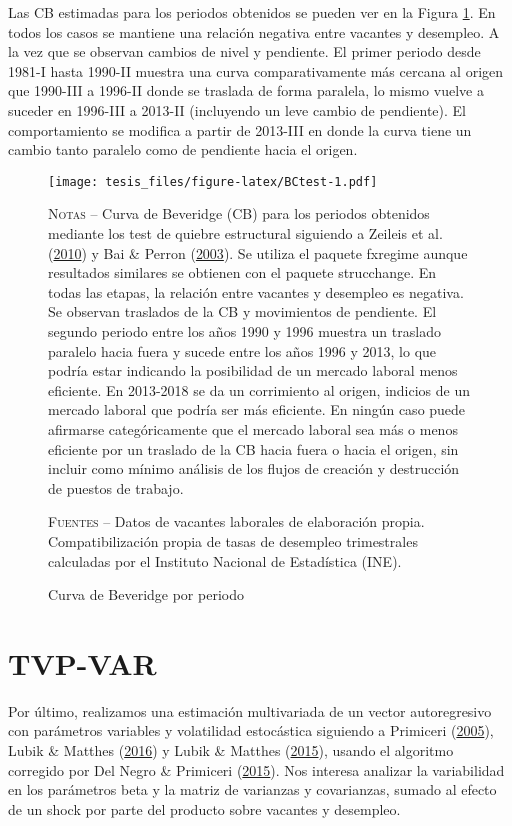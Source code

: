 \documentclass[12pt,oneside]{reedthesis}
\makeatletter
\def\maxwidth{ %
  \ifdim\Gin@nat@width>\linewidth
    \linewidth
  \else
    \Gin@nat@width
  \fi
}
\makeatother
\begin{document}
Las CB estimadas para los periodos obtenidos se pueden ver en la Figura \ref{fig:BCtest}. En todos los casos se mantiene una relación negativa entre vacantes y desempleo. A la vez que se observan cambios de nivel y pendiente. El primer periodo desde 1981-I hasta 1990-II muestra una curva comparativamente más cercana al origen que 1990-III a 1996-II donde se traslada de forma paralela, lo mismo vuelve a suceder en 1996-III a 2013-II (incluyendo un leve cambio de pendiente). El comportamiento se modifica a partir de 2013-III en donde la curva tiene un cambio tanto paralelo como de pendiente hacia el origen.
\begin{figure}
\texttt{[image: tesis\_files/figure-latex/BCtest-1.pdf]}
\caption{Curva de Beveridge por periodo}\label{fig:BCtest}\textsc{}

\footnotesize\textsc{Notas} -- Curva de Beveridge (CB) para los periodos obtenidos mediante los test de quiebre estructural siguiendo a Zeileis et al. (\protect\hyperlink{ref-Zeileis2010}{2010}) y Bai \& Perron (\protect\hyperlink{ref-BaiPerron2003}{2003}). Se utiliza el paquete fxregime aunque resultados similares se obtienen con el paquete strucchange. En todas las etapas, la relación entre vacantes y desempleo es negativa. Se observan traslados de la CB y movimientos de pendiente. El segundo periodo entre los años 1990 y 1996 muestra un traslado paralelo hacia fuera y sucede entre los años 1996 y 2013, lo que podría estar indicando la posibilidad de un mercado laboral menos eficiente. En 2013-2018 se da un corrimiento al origen, indicios de un mercado laboral que podría ser más eficiente. En ningún caso puede afirmarse categóricamente que el mercado laboral sea más o menos eficiente por un traslado de la CB hacia fuera o hacia el origen, sin incluir como mínimo análisis de los flujos de creación y destrucción de puestos de trabajo.

\textsc{Fuentes} -- Datos de vacantes laborales de elaboración propia. Compatibilización propia de tasas de desempleo trimestrales calculadas por el Instituto Nacional de Estadística (INE).
\end{figure}
\hypertarget{tvp-var-1}{%
\section{TVP-VAR}\label{tvp-var-1}}

Por último, realizamos una estimación multivariada de un vector autoregresivo con parámetros variables y volatilidad estocástica siguiendo a Primiceri (\protect\hyperlink{ref-Primiceri2005}{2005}), Lubik \& Matthes (\protect\hyperlink{ref-Lubik2016}{2016}) y Lubik \& Matthes (\protect\hyperlink{ref-Lubik2016b}{2015}), usando el algoritmo corregido por Del Negro \& Primiceri (\protect\hyperlink{ref-DelNegro2015}{2015}). Nos interesa analizar la variabilidad en los parámetros beta y la matriz de varianzas y covarianzas, sumado al efecto de un shock por parte del producto sobre vacantes y desempleo.
\end{document}

